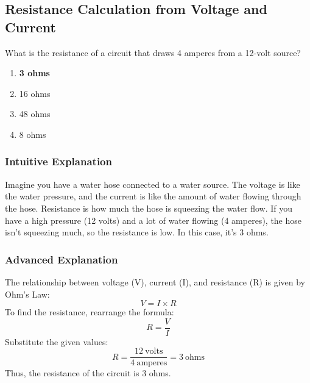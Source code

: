 \subsection{Resistance Calculation from Voltage and Current}
\label{T5D06}

\begin{tcolorbox}[colback=gray!10!white,colframe=black!75!black,title=T5D06]
What is the resistance of a circuit that draws 4 amperes from a 12-volt source?
\begin{enumerate}[noitemsep]
    \item \textbf{3 ohms}
    \item 16 ohms
    \item 48 ohms
    \item 8 ohms
\end{enumerate}
\end{tcolorbox}

\subsubsection*{Intuitive Explanation}
Imagine you have a water hose connected to a water source. The voltage is like the water pressure, and the current is like the amount of water flowing through the hose. Resistance is how much the hose is squeezing the water flow. If you have a high pressure (12 volts) and a lot of water flowing (4 amperes), the hose isn't squeezing much, so the resistance is low. In this case, it's 3 ohms.

\subsubsection*{Advanced Explanation}
The relationship between voltage (V), current (I), and resistance (R) is given by Ohm's Law:
\[
V = I \times R
\]
To find the resistance, rearrange the formula:
\[
R = \frac{V}{I}
\]
Substitute the given values:
\[
R = \frac{12\ \text{volts}}{4\ \text{amperes}} = 3\ \text{ohms}
\]
Thus, the resistance of the circuit is 3 ohms.